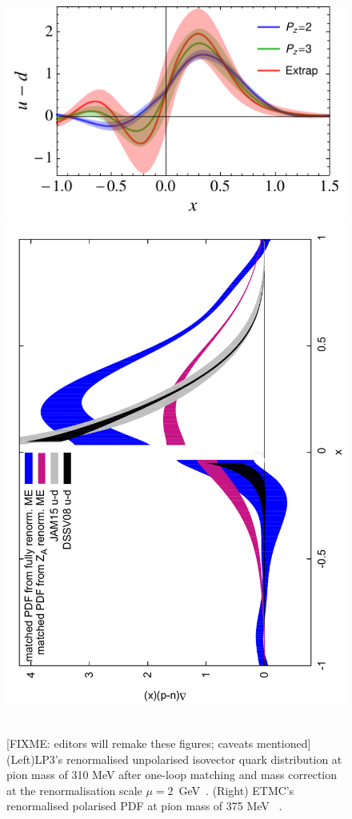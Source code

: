 \begin{figure}[t]
\centering
\includegraphics[width=.6\textwidth]{plots/pdf_nonorm}
\includegraphics[scale=0.4,angle=-90]{plots/qmatched_bare_vs_fit69v2}\,\,\,
\caption{\small [FIXME: editors will remake these figures; caveats mentioned] 
(Left)LP3's renormalised unpolarised isovector quark distribution at pion mass of 310 MeV after one-loop matching and mass correction at the renormalisation scale $\mu=2$~GeV~\cite{Chen:2017mzz}. %
(Right) ETMC's renormalised polarised PDF at pion mass of 375 MeV~\cite{Alexandrou:2017huk} . 
} \label{fig:qPDF-demo}
\end{figure}
